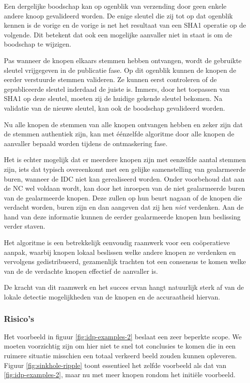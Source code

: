 Een dergelijke boodschap kan op ogenblik van verzending door geen enkele andere
knoop gevalideerd worden. De enige sleutel die zij tot op dat ogenblik kennen
is de vorige en de vorige is net het resultaat van een SHA1 operatie op de
volgende. Dit betekent dat ook een mogelijke aanvaller niet in staat is om de
boodschap te wijzigen.

Pas wanneer de knopen elkaars stemmen hebben ontvangen, wordt de gebruikte
sleutel vrijgegeven in de publicatie fase. Op dit ogenblik kunnen de knopen de
eerder verstuurde stemmen valideren. Ze kunnen eerst controleren of de
gepubliceerde sleutel inderdaad de juiste is. Immers, door het toepassen van
SHA1 op deze sleutel, moeten zij de huidige gekende sleutel bekomen. Na
validatie van de nieuwe sleutel, kan ook de boodschap gevalideerd worden.

Nu alle knopen de stemmen van alle knopen ontvangen hebben en zeker zijn dat de
stemmen authentiek zijn, kan met \'e\'enzelfde algoritme door alle knopen de
aanvaller bepaald worden tijdens de ontmaskering fase.

Het is echter mogelijk dat er meerdere knopen zijn met eenzelfde aantal stemmen
zijn, iets dat typisch overeenkomt met een gelijke samenstelling van
gealarmeerde buren, wanneer de IDC niet kan gerealiseerd worden. Onder
voorbehoud dat aan de NC wel voldaan wordt, kan door het inroepen van de niet
gealarmeerde buren van de gealarmeerde knopen. Deze zullen op hun beurt nagaan
of de knopen die verdacht worden, buren zijn en dan aangeven dat zij hen
\emph{niet} verdenken. Aan de hand van deze informatie kunnen de eerder
gealarmeerde knopen hun beslissing verder staven.

Het algoritme is een betrekkelijk eenvoudig raamwerk voor een co\"operatieve
aanpak, waarbij knopen lokaal beslissen welke andere knopen ze verdenken en
vervolgens gedistribueerd, gezamenlijk trachten tot een consensus te komen
welke van de de verdachte knopen effectief de aanvaller is.

De kracht van dit raamwerk en het succes ervan hangt natuurlijk sterk af van de
lokale detectie mogelijkheden van de knopen en de accuraatheid hiervan.

\subsubsection*{Risico's}

Het voorbeeld in figuur \ref{fig:idp-examples-2} beslaat een zeer beperkte
scope. We moeten voorzichtig zijn om hier niet te snel tot conclusies te komen
die in een ruimere situatie misschien een totaal verkeerd beeld zouden kunnen
opleveren. Figuur \ref{fig:sinkhole-ripple} toont essentieel het zelfde
voorbeeld als dat van \ref{fig:idp-examples-2}, maar nu met meer knopen rondom
het initi\"ele voorbeeld.

